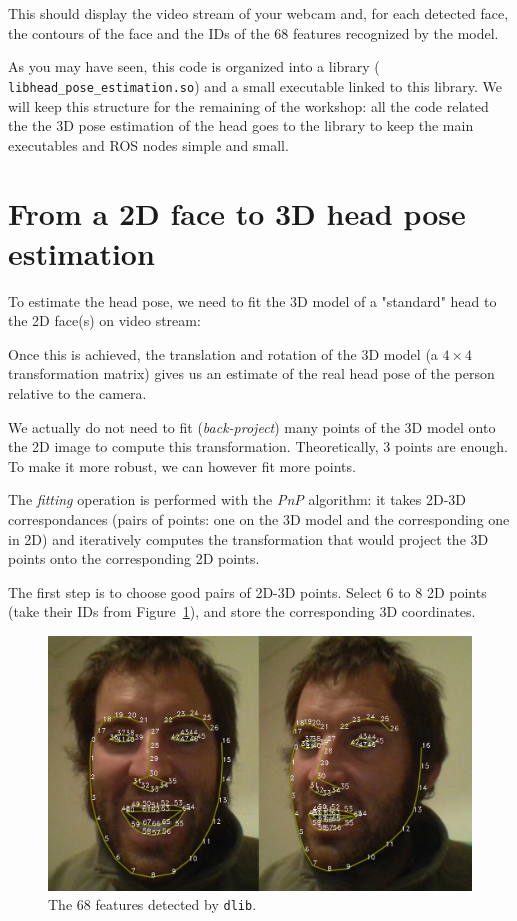 \documentclass{instructions}
\begin{document}
This should display the video stream of your webcam and, for each detected face,
the contours of the face and the IDs of the 68 features recognized by the model.

As you may have seen, this code is organized into a library ({\tt
libhead\_pose\_estimation.so}) and a small executable linked to this library.
We will keep this structure for the remaining of the workshop: all the code
related the the 3D pose estimation of the head goes to the library to keep the main
executables and ROS nodes simple and small.

\part{From a 2D face to 3D head pose estimation}

To estimate the head pose, we need to fit the 3D model of a "standard" head to the
2D face(s) on video stream:


Once this is achieved, the translation and rotation of the 3D model (a
$4\times4$ transformation matrix) gives us an estimate of the real head pose of
the person relative to the camera.

We actually do not need to fit (\emph{back-project}) many points of the 3D model
onto the 2D image to compute this transformation. Theoretically, 3 points are
enough. To make it more robust, we can however fit more points.

The \emph{fitting} operation is performed with the \emph{PnP} algorithm: it
takes 2D-3D correspondances (pairs of points: one on the 3D model and the
corresponding one in 2D) and iteratively computes the transformation that would
project the 3D points onto the corresponding 2D points.



The first step is to choose good pairs of 2D-3D points. Select 6 to 8 2D points
(take their IDs from Figure~\ref{dlib-features}), and store the corresponding 3D
coordinates.

\begin{figure}[h!]
    \centering
    \includegraphics[width=0.9\linewidth]{figs/dlib-features}
    \caption{The 68 features detected by {\tt dlib}.}
    \label{dlib-features}
\end{figure}
\end{document}
